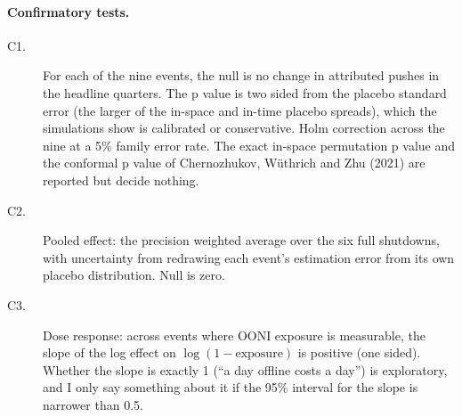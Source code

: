 \paragraph{Confirmatory tests.}
\begin{description}
\item[C1.] For each of the nine events, the null is no change in attributed pushes in the headline quarters. The p value is two sided from the placebo standard error (the larger of the in-space and in-time placebo spreads), which the simulations show is calibrated or conservative. Holm correction across the nine at a 5\% family error rate. The exact in-space permutation p value and the conformal p value of Chernozhukov, W\"uthrich and Zhu (2021) are reported but decide nothing.
\item[C2.] Pooled effect: the precision weighted average over the six full shutdowns, with uncertainty from redrawing each event's estimation error from its own placebo distribution. Null is zero.
\item[C3.] Dose response: across events where OONI exposure is measurable, the slope of the log effect on $\log(1-\text{exposure})$ is positive (one sided). Whether the slope is exactly 1 (``a day offline costs a day'') is exploratory, and I only say something about it if the 95\% interval for the slope is narrower than 0.5.
\end{description}

